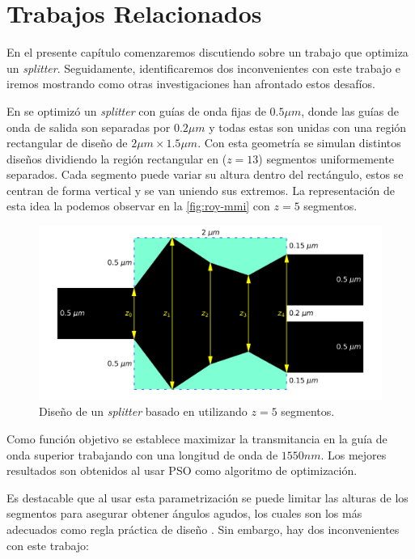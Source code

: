 \chapter{Trabajos Relacionados}

En el presente capítulo comenzaremos discutiendo sobre un trabajo que optimiza un \emph{splitter}.
Seguidamente, identificaremos dos inconvenientes con este trabajo e iremos mostrando como otras 
investigaciones han afrontado estos desafíos.

En \cite{Prosopio-Galarza2019} se optimizó un \emph{splitter} con guías de onda fijas de $0.5 \mu m$, 
donde las guías de onda de salida son separadas por $0.2 \mu m$ y 
todas estas son unidas con una región rectangular de diseño de $2 \mu m \times 1.5 \mu m$.
Con esta geometría se simulan distintos diseños dividiendo la región rectangular en ($z = 13$) segmentos
uniformemente separados.
Cada segmento puede variar su altura dentro del rectángulo, estos se centran de forma vertical y
se van uniendo sus extremos. 
La representación de esta idea la podemos observar en la \autoref{fig:roy-mmi} con $z = 5$ segmentos.

\begin{figure}[ht]
  \centering
  \includegraphics[scale=0.5]{image/related-works/mmi-angles.png}
  \caption{Diseño de un \emph{splitter} basado en \citep{Prosopio-Galarza2019} utilizando $z = 5$ segmentos.} 
  \label{fig:roy-mmi}
\end{figure}

Como función objetivo se establece maximizar la transmitancia en la guía de onda superior trabajando con una
longitud de onda de $1550 nm$.
Los mejores resultados son obtenidos al usar PSO como algoritmo de optimización.

Es destacable que al usar esta parametrización se puede limitar las alturas de los segmentos para asegurar 
obtener ángulos agudos, los cuales son los más adecuados como regla práctica de diseño
\citep{LukasChrostowski2010}.
Sin embargo, hay dos inconvenientes con este trabajo:

